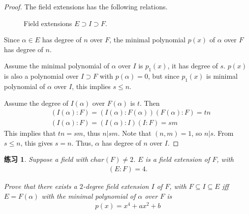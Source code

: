 \documentclass[utf8]{ctexbook}
\newtheorem{exercise}{练习}[section]
\begin{document}
\begin{proof}

The field extensions has the following relations.

\begin{figure}[ht!]
\begin{center}
\end{center}
\caption{Field extensions $E \supset I \supset F$.}
\end{figure}

Since $\alpha \in E$ has degree of $n$ over $F$, the minimal polynomial $p(x)$ of $\alpha$ over $F$ has degree of $n$.

Assume the minimal polynomial of $\alpha$ over $I$ is $p_1 (x)$, it has degree of $s$. $p(x)$ is also a polynomial over $I \supset F$ with $p(\alpha)=0$, but since $p_1(x)$ is minimal polynomial of $\alpha$ over $I$, this implies $s \leq n$. 

Assume the degree of $I(\alpha)$ over $F(\alpha)$ is $t$. Then
\begin{align*}
& (I(\alpha) : F) = (I(\alpha) : F(\alpha) ) (F(\alpha): F) = t n \\
& (I(\alpha) : F) = (I(\alpha) : I) (I: F) = sm
\end{align*}
This implies that $tn = sm$, thus $n | sm$. Note that $(n,m)=1$, so $n |s$. From $s \leq n$, this gives $s = n$. Thus, $\alpha$ has degree of $n$ over $I$. 

\end{proof}



\begin{exercise}
Suppose a field with $char(F) \neq 2$. $E$ is a field extension of $F$, with
\begin{align*}
(E:F) = 4 .
\end{align*}

Prove that there exists a $2$-degree field extension $I$ of $F$, with $F \subseteq I \subseteq E$ \underline{iff} $E=F(\alpha)$ with the minimal polynomial of $\alpha$ over $F$ is
\begin{align*}
p(x) = x^4 + ax^2 + b
\end{align*}

\end{exercise}
\end{document}
